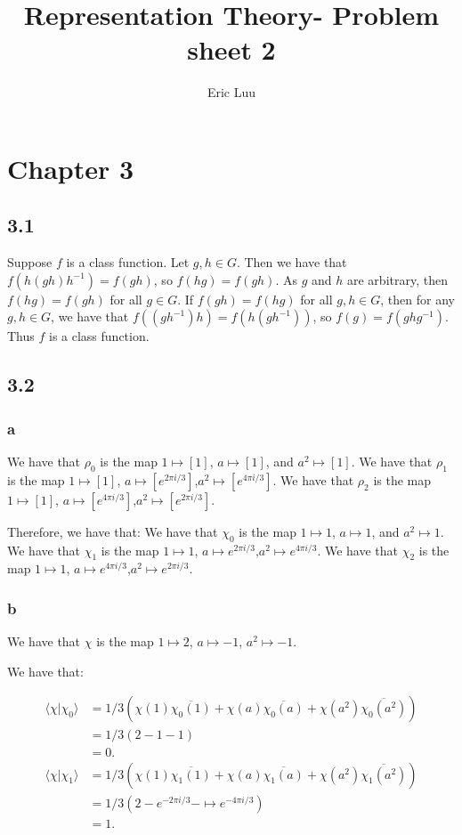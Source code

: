 \documentclass[]{article}
\title{Representation Theory- Problem sheet 2}
\author{Eric Luu}
\begin{document}
\maketitle

\section*{Chapter 3}
\subsection*{3.1}
Suppose $f$ is a class function. Let $g, h \in G$. Then we have that $f(h (gh) h^{-1}) = f(gh)$, so $f(hg) = f(gh)$. As $g$ and $h$ are arbitrary, then $f(hg) = f(gh) $ for all $g \in G$. If $f(gh) = f(hg)$ for all $g, h \in G$, then for any $g, h \in G$, we have that $f((gh^{-1})h)= f(h (gh^{-1}))$, so $f(g) = f(ghg^{-1})$. Thus $f$ is a class function.
\subsection*{3.2}
\subsubsection*{a}
We have that $\rho_0$ is the map $1 \mapsto [1]$, $a \mapsto [1]$, and $a^2 \mapsto [1]$.
We have that $\rho_1$ is the map $1 \mapsto [1]$, $a \mapsto [e^{2 \pi i/3}]$,$a^2 \mapsto [e^{4 \pi i/3}]$.
We have that $\rho_2$ is the map $1 \mapsto [1]$, $a \mapsto [e^{4 \pi i/3}]$,$a^2 \mapsto [e^{2 \pi i/3}]$.

Therefore, we have that:
We have that $\chi_0$ is the map $1 \mapsto 1$, $a \mapsto 1$, and $a^2 \mapsto 1$.
We have that $\chi_1$ is the map $1 \mapsto 1$, $a \mapsto e^{2 \pi i/3}$,$a^2 \mapsto e^{4 \pi i/3}$.
We have that $\chi_2$ is the map $1 \mapsto 1$, $a \mapsto e^{4 \pi i/3}$,$a^2 \mapsto e^{2 \pi i/3}$.

\subsubsection*{b}
We have that $\chi$ is the map $1 \mapsto 2$, $a \mapsto -1$, $a^2 \mapsto -1$. 

We have that:

\begin{align*}
	 \langle \chi | \chi_0 \rangle &= 1/3 \left( \chi(1)\overline{\chi_0(1)} +   \chi(a)\overline{\chi_0(a)} + \chi(a^2)\overline{\chi_0(a^2)}   \right) \\
	 &= 1/3(2 - 1 - 1) \\
	 &= 0.
\end{align*}
\begin{align*}
	\langle \chi | \chi_1 \rangle &= 1/3 \left( \chi(1)\overline{\chi_1(1)} +   \chi(a)\overline{\chi_1(a)} + \chi(a^2)\overline{\chi_1(a^2)}   \right) \\
	&= 1/3(2 -e^{-2 \pi i/3} - \mapsto e^{-4 \pi i/3}) \\
	&= 1.
\end{align*}
\end{document}
